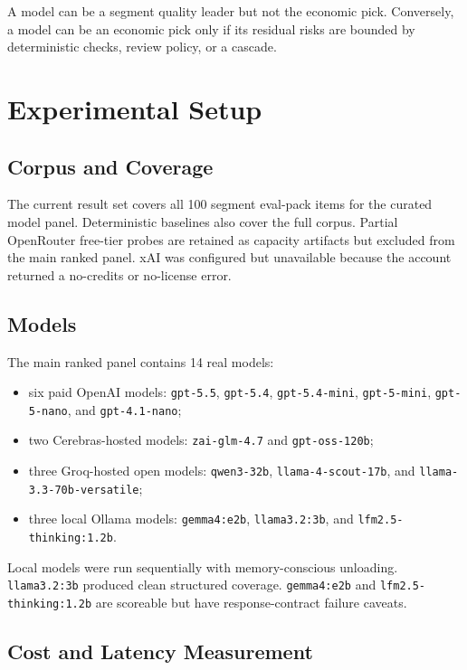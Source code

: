 \documentclass[11pt]{article}
\newcommand{\code}[1]{\texttt{#1}}
\begin{document}
A model can be a segment quality leader but not the economic pick. Conversely, a model can be an economic pick only if its residual risks are bounded by deterministic checks, review policy, or a cascade.

\section{Experimental Setup}

\subsection{Corpus and Coverage}

The current result set covers all 100 segment eval-pack items for the curated model panel. Deterministic baselines also cover the full corpus. Partial OpenRouter free-tier probes are retained as capacity artifacts but excluded from the main ranked panel. xAI was configured but unavailable because the account returned a no-credits or no-license error.

\subsection{Models}

The main ranked panel contains 14 real models:

\begin{itemize}[leftmargin=*]
  \item six paid OpenAI models: \code{gpt-5.5}, \code{gpt-5.4}, \code{gpt-5.4-mini}, \code{gpt-5-mini}, \code{gpt-5-nano}, and \code{gpt-4.1-nano};
  \item two Cerebras-hosted models: \code{zai-glm-4.7} and \code{gpt-oss-120b};
  \item three Groq-hosted open models: \code{qwen3-32b}, \code{llama-4-scout-17b}, and \code{llama-3.3-70b-versatile};
  \item three local Ollama models: \code{gemma4:e2b}, \code{llama3.2:3b}, and \code{lfm2.5-thinking:1.2b}.
\end{itemize}

Local models were run sequentially with memory-conscious unloading. \code{llama3.2:3b} produced clean structured coverage. \code{gemma4:e2b} and \code{lfm2.5-thinking:1.2b} are scoreable but have response-contract failure caveats.

\subsection{Cost and Latency Measurement}
\end{document}
